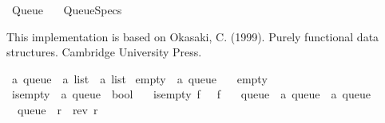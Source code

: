 %
\begin{isabellebody}%
%
%
\isadelimtheory
%
\endisadelimtheory
%
\isatagtheory
{}\isamarkupfalse%
\ Queue\isanewline
\ \ \ Queue{\isacharunderscore}{\kern0pt}Specs\isanewline
{}%
\endisatagtheory
{\isafoldtheory}%
%
\isadelimtheory
%
\endisadelimtheory
%
\isadelimdocument
%
\endisadelimdocument
%
\isatagdocument
%
\isamarkupsection{%
}
\isamarkuptrue%
%
\endisatagdocument
{\isafolddocument}%
%
\isadelimdocument
%
\endisadelimdocument
%
\begin{isamarkuptext}%
This implementation is based on
Okasaki, C. (1999). Purely functional data structures. Cambridge University Press.%
\end{isamarkuptext}\isamarkuptrue%
\isamarkupfalse%
\ {\isacharprime}{\kern0pt}a\ queue\ {\isacharequal}{\kern0pt}\ {\isachardoublequoteopen}{\isacharprime}{\kern0pt}a\ list\ {\isasymtimes}\ {\isacharprime}{\kern0pt}a\ list{\isachardoublequoteclose}\isanewline
\isanewline
{}\isamarkupfalse%
\ empty\ {\isacharcolon}{\kern0pt}{\isacharcolon}{\kern0pt}\ {\isachardoublequoteopen}{\isacharprime}{\kern0pt}a\ queue{\isachardoublequoteclose}\ \isanewline
\ \ {\isachardoublequoteopen}empty\ {\isacharequal}{\kern0pt}\ {\isacharparenleft}{\kern0pt}{\isacharbrackleft}{\kern0pt}{\isacharbrackright}{\kern0pt}{\isacharcomma}{\kern0pt}\ {\isacharbrackleft}{\kern0pt}{\isacharbrackright}{\kern0pt}{\isacharparenright}{\kern0pt}{\isachardoublequoteclose}\isanewline
\isanewline
{}\isamarkupfalse%
\ is{\isacharunderscore}{\kern0pt}empty\ {\isacharcolon}{\kern0pt}{\isacharcolon}{\kern0pt}\ {\isachardoublequoteopen}{\isacharprime}{\kern0pt}a\ queue\ {\isasymRightarrow}\ bool{\isachardoublequoteclose}\ \isanewline
\ \ {\isachardoublequoteopen}is{\isacharunderscore}{\kern0pt}empty\ {\isacharparenleft}{\kern0pt}f{\isacharcomma}{\kern0pt}\ {\isacharunderscore}{\kern0pt}{\isacharparenright}{\kern0pt}\ {\isasymlongleftrightarrow}\ f\ {\isacharequal}{\kern0pt}\ {\isacharbrackleft}{\kern0pt}{\isacharbrackright}{\kern0pt}{\isachardoublequoteclose}\isanewline
\isanewline
{}\isamarkupfalse%
\ queue\ {\isacharcolon}{\kern0pt}{\isacharcolon}{\kern0pt}\ {\isachardoublequoteopen}{\isacharprime}{\kern0pt}a\ queue\ {\isasymRightarrow}\ {\isacharprime}{\kern0pt}a\ queue{\isachardoublequoteclose}\ \isanewline
\ \ {\isachardoublequoteopen}queue\ {\isacharparenleft}{\kern0pt}{\isacharbrackleft}{\kern0pt}{\isacharbrackright}{\kern0pt}{\isacharcomma}{\kern0pt}\ r{\isacharparenright}{\kern0pt}\ {\isacharequal}{\kern0pt}\ {\isacharparenleft}{\kern0pt}rev\ r{\isacharcomma}{\kern0pt}\ {\isacharbrackleft}{\kern0pt}{\isacharbrackright}{\kern0pt}{\isacharparenright}{\kern0pt}{\isachardoublequoteclose}\ {\isacharbar}{\kern0pt}\isanewline

\end{isabellebody}
